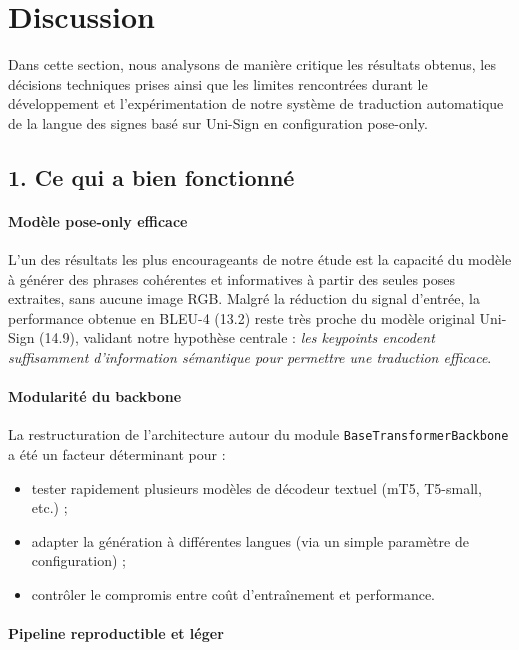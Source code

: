 \section{Discussion}

Dans cette section, nous analysons de manière critique les résultats obtenus, les décisions techniques prises ainsi que les limites rencontrées durant le développement et l’expérimentation de notre système de traduction automatique de la langue des signes basé sur Uni-Sign en configuration pose-only.

\subsection*{1. Ce qui a bien fonctionné}

\paragraph{Modèle pose-only efficace}

L’un des résultats les plus encourageants de notre étude est la capacité du modèle à générer des phrases cohérentes et informatives à partir des seules poses extraites, sans aucune image RGB. Malgré la réduction du signal d’entrée, la performance obtenue en BLEU-4 (13.2) reste très proche du modèle original Uni-Sign (14.9), validant notre hypothèse centrale : \textit{les keypoints encodent suffisamment d'information sémantique pour permettre une traduction efficace}.

\paragraph{Modularité du backbone}

La restructuration de l’architecture autour du module \texttt{BaseTransformerBackbone} a été un facteur déterminant pour :
\begin{itemize}
    \item tester rapidement plusieurs modèles de décodeur textuel (mT5, T5-small, etc.) ;
    \item adapter la génération à différentes langues (via un simple paramètre de configuration) ;
    \item contrôler le compromis entre coût d'entraînement et performance.
\end{itemize}

\paragraph{Pipeline reproductible et léger}

